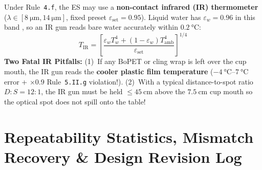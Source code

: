 \begin{twocol}[0.52]
\begin{trapbox}
Under Rule~\texttt{4.f}, the ES may use a \textbf{non-contact infrared (IR) thermometer} ($\lambda \in [\SI{8}{\micro\meter}, \SI{14}{\micro\meter}]$, fixed preset $\varepsilon_{\mathrm{set}} = 0.95$). Liquid water has $\varepsilon_w = 0.96$ in this band , so an IR gun reads bare water accurately within $\SI{0.2}{\celsius}$:
\[
  T_{\mathrm{IR}} = \left[\frac{\varepsilon_w T_w^4 + (1-\varepsilon_w)T_{\mathrm{amb}}^4}{\varepsilon_{\mathrm{set}}}\right]^{1/4}
\]
\textbf{Two Fatal IR Pitfalls:} (1)~If any BoPET or cling wrap is left over the cup mouth, the IR gun reads the \textbf{cooler plastic film temperature} ($-\SIrange{4}{7}{\celsius}$ error + $\times 0.9$ Rule~\texttt{5.II.g} violation!). (2)~With a typical distance-to-spot ratio $D\!:\!S = 12\!:\!1$, the IR gun must be held $\le\SI{45}{\centi\meter}$ above the $\SI{7.5}{\centi\meter}$ cup mouth so the optical spot does not spill onto the table!
\end{trapbox}
\end{twocol}

\section{Repeatability Statistics, Mismatch Recovery \& Design Revision Log}\label{sec:16.5}


